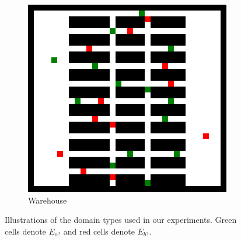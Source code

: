 \documentclass[letterpaper]{article} %
\def\
UrlFont{\rm}  %
\newcommand{\plan}[1]{\textbf{[\color{blue}PLAN:#1]}}
\newcommand{\commentout}[1]{}
\newcommand{\eao}{E_{o?}} %
\newcommand{\eab}{E_{b?}} %
\theoremstyle{definition}
\begin{document}
\begin{figure}[t]
\begin{subfigure}[b]{0.32\columnwidth}
      \includegraphics[scale=.3]{Figures/warehouse-32-32.map.png}
      \caption{Warehouse}
    \end{subfigure}
    \caption{Illustrations of the domain types used in our experiments. Green cells denote $\eao$ and red cells denote $\eab$.}
    \label{fig:grids}
\end{figure}

\commentout{
\begin{figure}[tbhp]
    \centering
    \begin{subfigure}[b]{0.69\columnwidth}\centering
      \texttt{[image: Figures/maze/mixed\_sm\_figures/Cactus-and-legend.png]}
    \end{subfigure}
    \begin{subfigure}[b]{0.69\columnwidth}\centering
      \texttt{[image: Figures/warehouse/mixed\_sm\_figures/Cactus.png]}
    \end{subfigure}
    \begin{subfigure}[b]{0.69\columnwidth}\centering
      \texttt{[image: Figures/room/mixed\_sm\_figures/Cactus.png]}
    \end{subfigure}
    \caption{Number of solved problems per runtime for Maze (left), Warehouse (middle), and Rooms (right).}
    \label{fig:rt-soc-results}
\end{figure}
}
\end{document}

